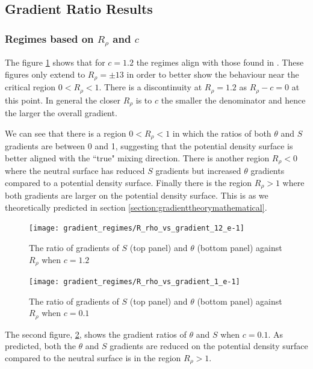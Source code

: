 \subsection{Gradient Ratio Results}
\label{subsection:gradienttresults}

\subsubsection{Regimes based on $R_\rho$ and $c$}
\label{subsubsection:gradientresultsR_Rhoandc}

The figure \ref{fig:gradient_results_r_rho_c_12} shows that for $c=1.2$ the regimes align with those found in \citet{McDougall1987}. These figures only extend to $R_\rho = \pm 13$ in order to better show the behaviour near the critical region $0<R_\rho<1$. There is a discontinuity at $R_\rho = 1.2$ as $R_\rho - c = 0$ at this point. In general the closer $R_\rho$ is to $c$ the smaller the denominator and hence the larger the overall gradient.   

We can see that there is a region $0<R_\rho<1$ in which the ratios of both $\theta$ and $S$ gradients are between 0 and 1, suggesting that the potential density surface is better aligned with the ``true" mixing direction. There is another region $R_\rho<0$ where the neutral surface has reduced $S$ gradients but increased $\theta$ gradients compared to a potential density surface. Finally there is the region $R_\rho>1$ where both gradients are larger on the potential density surface. This is as we theoretically predicted in section \ref{section:gradienttheorymathematical}.

\begin{figure}[htbp]
    \centering
    \texttt{[image: gradient\_regimes/R\_rho\_vs\_gradient\_12\_e-1]}
    \caption{The ratio of gradients of $S$ (top panel) and $\theta$ (bottom panel) against $R_\rho$ when $c=1.2$}
    \label{fig:gradient_results_r_rho_c_12}
\end{figure}

\begin{figure}[htbp]
    \centering
    \texttt{[image: gradient\_regimes/R\_rho\_vs\_gradient\_1\_e-1]}
    \caption{The ratio of gradients of $S$ (top panel) and $\theta$ (bottom panel) against $R_\rho$ when $c=0.1$}
    \label{fig:gradient_results_r_rho_c_1}
\end{figure}

The second figure, \ref{fig:gradient_results_r_rho_c_1}, shows the gradient ratios of $\theta$ and $S$ when $c = 0.1$. As predicted, both the $\theta$ and $S$ gradients are reduced on the potential density surface compared to the neutral surface is in the region $R_\rho>1$.

